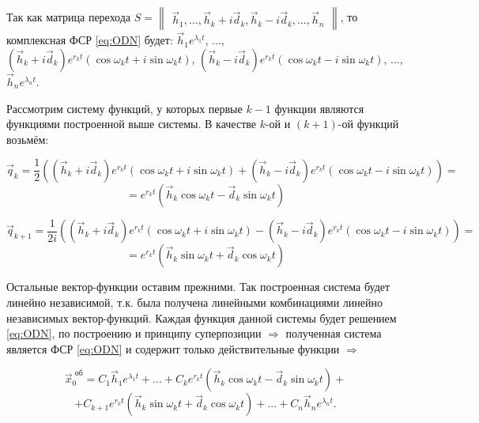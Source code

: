 Так как матрица перехода $S = \begin{Vmatrix*} \overrightarrow{h}_1, \ldots, \overrightarrow{h}_k + i \overrightarrow{d}_k, \overrightarrow{h}_k - i \overrightarrow{d}_k, \ldots, \overrightarrow{h}_n \end{Vmatrix*}$,
то комплексная ФСР \eqref{eq:ODN} будет: $\overrightarrow{h}_1 e^{\lambda_1 t}$, ..., $(\overrightarrow{h}_k + i \overrightarrow{d}_k) e^{r_k t} (\cos\omega_k t + i \sin \omega_k t)$, 
$(\overrightarrow{h}_k - i \overrightarrow{d}_k) e^{r_k t} (\cos\omega_k t - i \sin \omega_k t)$, ..., $\overrightarrow{h}_n e^{\lambda_n t}$. 

Рассмотрим систему функций, у которых первые $k-1$ функции являются функциями построенной выше системы. В качестве $k$-ой и $(k+1)$-ой функций возьмём:

\[
  \overrightarrow{q}_k = \frac{1}{2} \left((\overrightarrow{h}_k + i \overrightarrow{d}_k) e^{r_k t} (\cos \omega_k t + i \sin \omega_k t) + (\overrightarrow{h}_k - i \overrightarrow{d}_k) e^{r_k t} (\cos \omega_k t - i \sin \omega_k t) \right) = 
\]
\[
  = e^{r_k t} (\overrightarrow{h}_k \cos \omega_k t - \overrightarrow{d}_k \sin \omega_k t)
\]

\[
  \overrightarrow{q}_{k+1} = \frac{1}{2i} \left((\overrightarrow{h}_k + i \overrightarrow{d}_k) e^{r_k t} (\cos \omega_k t + i \sin \omega_k t) - (\overrightarrow{h}_k - i \overrightarrow{d}_k) e^{r_k t} (\cos \omega_k t - i \sin \omega_k t) \right)  = 
\]
\[
  = e^{r_k t} (\overrightarrow{h}_k \sin \omega_k t + \overrightarrow{d}_k \cos \omega_k t)
\]

Остальные вектор-функции оставим прежними. Так построенная система будет линейно независимой, т.к. была получена линейными комбинациями линейно независимых вектор-функций. Каждая функция данной системы будет решением \eqref{eq:ODN}, по построению и принципу суперпозиции $\Rightarrow$ полученная система является ФСР \eqref{eq:ODN} и содержит только действительные функции $\Rightarrow$

\begin{equation*}
  \overrightarrow{x}^{\text{ об}}_0 = C_1 \overrightarrow{h}_1 e^{\lambda_1 t} + ...+ C_k e^{r_k t} (\overrightarrow{h}_k \cos \omega_k t - \overrightarrow{d}_k \sin \omega_k t) +
\end{equation*}
\begin{equation*}
  + C_{k+1} e^{r_k t} (\overrightarrow{h}_k \sin \omega_k t + \overrightarrow{d}_k \cos \omega_k t) + ... + C_n \overrightarrow{h}_n e^{\lambda_n t}.
\end{equation*}

